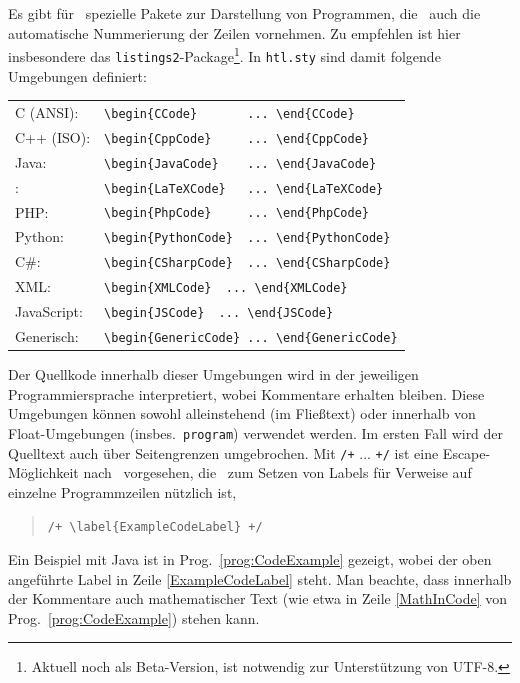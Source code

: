 Es gibt für \latex\ spezielle Pakete zur Darstellung von Programmen, die \ua\
auch die automatische Nummerierung der Zeilen vornehmen. Zu empfehlen ist hier
insbesondere das \texttt{listings2}-Package\footnote{Aktuell noch als
Beta-Version, ist notwendig zur Unterstützung von UTF-8.}. In \texttt{htl.sty}
sind damit folgende Umgebungen definiert:
%
\begin{center}
\begin{tabular}{ll}
C (ANSI):   & \verb!\begin{CCode}       ... \end{CCode}! \\
C++ (ISO):  & \verb!\begin{CppCode}     ... \end{CppCode}! \\
Java:       & \verb!\begin{JavaCode}    ... \end{JavaCode}! \\
\latex:     & \verb!\begin{LaTeXCode}   ... \end{LaTeXCode}! \\
PHP:  		& \verb!\begin{PhpCode}     ... \end{PhpCode}! \\
Python:  	& \verb!\begin{PythonCode}  ... \end{PythonCode}! \\
C\#:  		& \verb!\begin{CSharpCode}  ... \end{CSharpCode}! \\
XML:  		& \verb!\begin{XMLCode}  ... \end{XMLCode}! \\
JavaScript:  		& \verb!\begin{JSCode}  ... \end{JSCode}! \\
Generisch:  & \verb!\begin{GenericCode} ... \end{GenericCode}! 
\end{tabular}
\end{center}
%
Der Quellkode innerhalb dieser Umgebungen wird in der jeweiligen Programmiersprache interpretiert, wobei Kommentare erhalten bleiben. Diese Umgebungen können sowohl alleinstehend (im Fließtext) oder innerhalb von Float-Umgebungen (insbes.\ \texttt{program}) verwendet werden. Im ersten Fall wird der Quelltext auch über Seitengrenzen umgebrochen. Mit \verb!/+! ... \verb!+/! ist eine Escape-Möglichkeit nach \latex\ vorgesehen, die \va\ zum Setzen von Labels für Verweise auf einzelne Programmzeilen nützlich ist, \zB
%
\begin{quote}
\verb!/+ \label{ExampleCodeLabel} +/!
\end{quote}
%
Ein Beispiel mit Java ist in Prog.~\ref{prog:CodeExample} gezeigt, wobei der oben angeführte Label in Zeile \ref{ExampleCodeLabel} steht.
Man beachte, dass innerhalb der Kommentare auch mathematischer Text (wie etwa in Zeile \ref{MathInCode} von Prog.~\ref{prog:CodeExample}) stehen kann.

